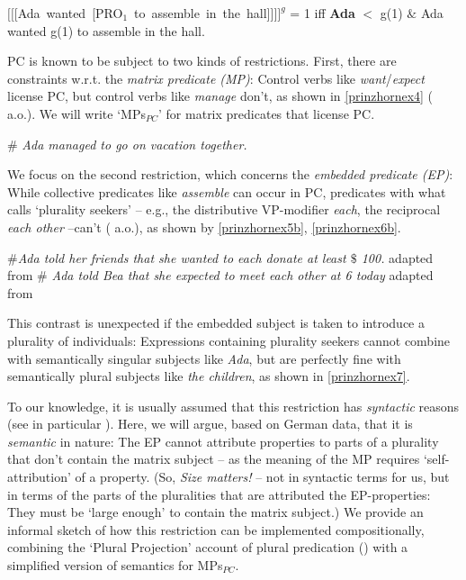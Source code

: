 \documentclass[output=paper,colorlinks,citecolor=brown,
]{langscibook}
\newcommand{\sem}[2]{\mbox{$[\![${#2}$]\!]^{#1}$}} %
\begin{document}
\ea	\label{prinzhornex3} \sem{g}{[Ada wanted [PRO$_{1}$ to assemble in the hall]]} = 1 iff \textbf{Ada} $<$ g(1) $\&$ Ada wanted g(1) to assemble in the hall. \z

PC is known to be subject to two kinds of restrictions. First, there are constraints w.r.t. the {\it matrix predicate (MP)}: Control verbs like {\it want}/{\it expect} license PC, but control verbs like {\it  manage} don't, as shown in \ref{prinzhornex4} (\citealt{Landau:2000, Pearson:2016} a.o.). We will write `MPs$_{PC}$' for matrix predicates that license PC.

\ea 	\label{prinzhornex4}
  $\#$ {\it Ada managed  to go on vacation together.} \hfill \cite[(2b)]{Pearson:2016}
\z
	
We focus on the second restriction, which concerns the {\it embedded predicate (EP)}: While collective predicates like  {\it assemble} can occur in PC, predicates with what \cite{Schwarzschild:1996} calls `plurality seekers' -- e.g., the distributive VP-modifier {\it each}, the reciprocal  {\it each other} --can't (\citealt{Landau:2000} a.o.), as shown by \ref{prinzhornex5b}, \ref{prinzhornex6b}.

\ea\label{prinzhornex5}
\ea \label{prinzhornex5b}  $\#${\it Ada told her friends that she wanted to each donate at least $\$$ 100.} \newline \phantom{.}\hfill adapted from \cite[48 (61a)]{Landau:2000}
\ex \label{prinzhornex6b}		 $\#$ {\it Ada told Bea that she expected to meet each other at 6 today} \newline \phantom{.}\hfill  adapted from \cite[59 (61a)]{Landau:2000}
\z\z

This contrast is unexpected if the embedded subject is taken to introduce a plurality of individuals: Expressions containing plurality seekers cannot combine with semantically singular subjects like {\it Ada}, but are perfectly fine with semantically plural subjects like {\it the children}, as shown in \ref{prinzhornex7}.

\ea \label{prinzhornex7}
\z\z

To our knowledge, it is usually assumed that this restriction has {\it syntactic} reasons (see in particular \citealt{Landau:2000}). Here, we will argue, based on German data, that it is {\it semantic} in nature: The EP cannot attribute properties to parts of a plurality that don't contain the matrix subject --  as the meaning of the MP requires `self-attribution' of a property. (So, \textit{Size matters!} -- not in syntactic terms for us, but in terms of the parts of the pluralities that are attributed the EP-properties: They must be `large enough' to contain the matrix subject.) We provide an informal sketch of how this restriction can be implemented compositionally, combining  the `Plural Projection' account of plural predication (\citealt{Schmitt:2019, Haslinger:2018a, Haslinger:2018b}) with a simplified version of \cite{Pearson:2016} semantics for MPs$_{PC}$.
\end{document}
